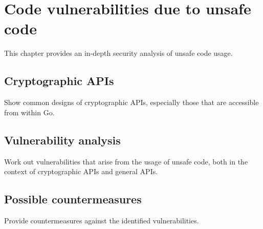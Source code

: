 
\chapter{Code vulnerabilities due to unsafe code}\label{ch:code-vulnerabilities}

This chapter provides an in-depth security analysis of unsafe code usage.



\section{Cryptographic APIs}\label{sec:cryptographic-apis}

Show common designs of cryptographic APIs, especially those that are accessible from
within Go.



\section{Vulnerability analysis}\label{sec:vulnerability-analysis}

Work out vulnerabilities that arise from the usage of unsafe code, both in the context
of cryptographic APIs and general APIs.



\section{Possible countermeasures}\label{sec:countermeasures}

Provide countermeasures against the identified vulnerabilities.
